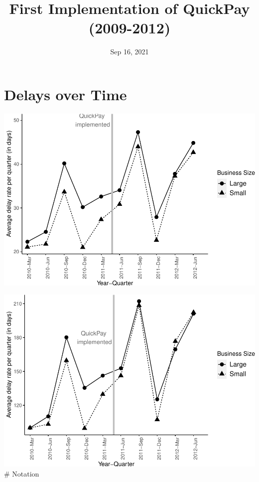 \documentclass[
]{article}
\title{First Implementation of QuickPay (2009-2012)}
\author{}
\date{\vspace{-2.5em}Sep 16, 2021}
\begin{document}
\maketitle

\hypertarget{delays-over-time}{%
\section{Delays over Time}\label{delays-over-time}}

\includegraphics{qp_first_implementation_files/figure-latex/plot-1.pdf}

\includegraphics{qp_first_implementation_files/figure-latex/normalized_plot-1.pdf}
\# Notation
\end{document}

